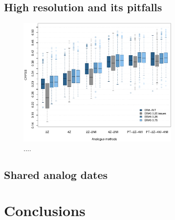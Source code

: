 \documentclass[alpha-refs]{wiley-article}
\begin{document}

\subsection{High resolution and its pitfalls}


\begin{figure}[bt]
	\centering
	\includegraphics[width=80mm]{figures/boxplot-resol.pdf}
	\caption{....}
	\label{fig:resolution}
\end{figure}


\subsection{Shared analog dates}

\section{Conclusions}








\end{document}
